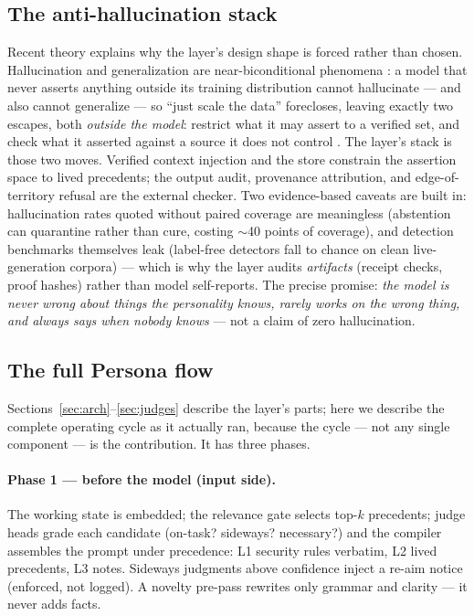 \documentclass[11pt]{article}
\begin{document}
\subsection{The anti-hallucination stack}
Recent theory explains why the layer's design shape is forced rather than chosen. Hallucination and generalization are near-biconditional phenomena \cite{das2026innovation}: a model that never asserts anything outside its training distribution cannot hallucinate --- and also cannot generalize --- so ``just scale the data'' forecloses, leaving exactly two escapes, both \emph{outside the model}: restrict what it may assert to a verified set, and check what it asserted against a source it does not control \cite{kalai2025hallucinate}. The layer's stack is those two moves. Verified context injection and the store constrain the assertion space to lived precedents; the output audit, provenance attribution, and edge-of-territory refusal are the external checker. Two evidence-based caveats are built in: hallucination rates quoted without paired coverage are meaningless (abstention can quarantine rather than cure, costing ${\sim}$40 points of coverage), and detection benchmarks themselves leak (label-free detectors fall to chance on clean live-generation corpora) --- which is why the layer audits \emph{artifacts} (receipt checks, proof hashes) rather than model self-reports. The precise promise: \emph{the model is never wrong about things the personality knows, rarely works on the wrong thing, and always says when nobody knows} --- not a claim of zero hallucination.

\subsection{The full Persona flow}
\label{sec:fullflow}

Sections~\ref{sec:arch}--\ref{sec:judges} describe the layer's parts; here we describe the complete operating cycle as it actually ran, because the cycle --- not any single component --- is the contribution. It has three phases.

\paragraph{Phase 1 --- before the model (input side).} The working state is embedded; the relevance gate selects top-$k$ precedents; judge heads grade each candidate (on-task? sideways? necessary?) and the compiler assembles the prompt under precedence: L1 security rules verbatim, L2 lived precedents, L3 notes. Sideways judgments above confidence inject a re-aim notice (enforced, not logged). A novelty pre-pass rewrites only grammar and clarity --- it never adds facts.
\end{document}
